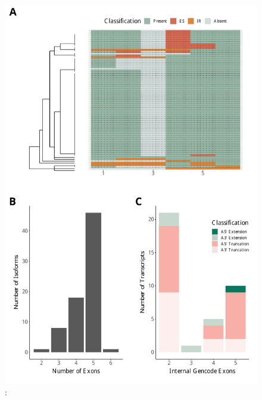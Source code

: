 \begin{figure}[htp]
	\begin{center}
		\includegraphics[page=2,trim={0 21cm 0 0cm},scale = 0.55]{Figures/TargetGenes.pdf}
	\end{center}
	\captionsetup{width=0.95\textwidth}
	\caption[Trem2]%
	{\textbf{}: }   
	\label{fig:abca7}
\end{figure}


